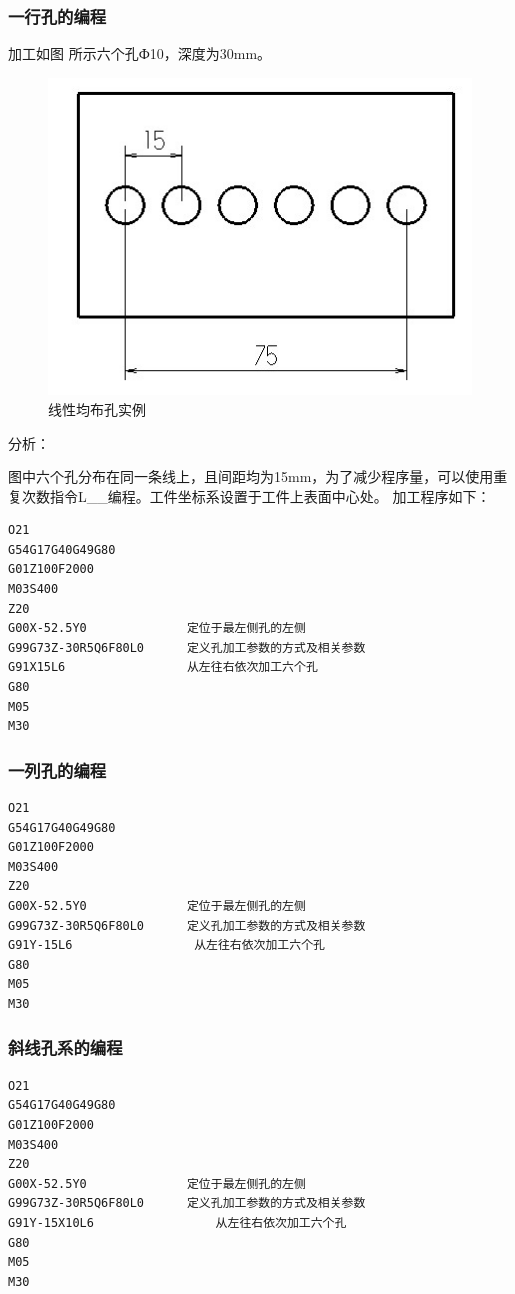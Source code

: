 \subsubsection{一行孔的编程}
加工如图 所示六个孔Ф10，深度为30mm。
\begin{figure}[h]
	\centering
	\includegraphics[width=0.7\linewidth]{data/image/22-1}
	\caption{线性均布孔实例}
	\label{fig:22-1}
\end{figure}

分析：

图中六个孔分布在同一条线上，且间距均为15mm，为了减少程序量，可以使用重复次数指令L\_\_编程。工件坐标系设置于工件上表面中心处。
加工程序如下：
\begin{lstlisting}
O21
G54G17G40G49G80
G01Z100F2000
M03S400
Z20                      
G00X-52.5Y0              定位于最左侧孔的左侧
G99G73Z-30R5Q6F80L0      定义孔加工参数的方式及相关参数
G91X15L6                 从左往右依次加工六个孔
G80
M05
M30
\end{lstlisting}

\subsubsection{一列孔的编程}
\begin{lstlisting}
O21
G54G17G40G49G80
G01Z100F2000
M03S400
Z20                      
G00X-52.5Y0              定位于最左侧孔的左侧
G99G73Z-30R5Q6F80L0      定义孔加工参数的方式及相关参数
G91Y-15L6                 从左往右依次加工六个孔
G80
M05
M30
\end{lstlisting}

\subsubsection{斜线孔系的编程}
\begin{lstlisting}
O21
G54G17G40G49G80
G01Z100F2000
M03S400
Z20                      
G00X-52.5Y0              定位于最左侧孔的左侧
G99G73Z-30R5Q6F80L0      定义孔加工参数的方式及相关参数
G91Y-15X10L6                 从左往右依次加工六个孔
G80
M05
M30
\end{lstlisting}

